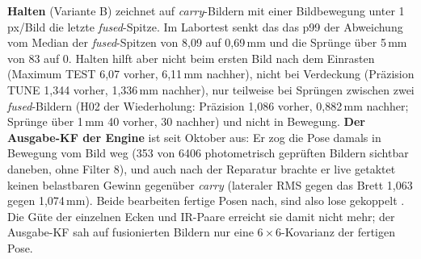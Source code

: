 \documentclass[11pt,a4paper,fleqn]{article}
\begin{document}
\textbf{Halten} (Variante B) zeichnet auf \emph{carry}-Bildern mit einer Bildbewegung unter 1\,px/Bild die letzte
\emph{fused}-Spitze. Im Labortest senkt das das p99 der Abweichung vom Median der \emph{fused}-Spitzen von 8,09
auf 0,69\,mm und die Sprünge über 5\,mm von 83 auf 0. Halten hilft aber nicht beim ersten Bild nach dem
Einrasten (Maximum TEST 6,07 vorher, 6,11\,mm nachher), nicht bei Verdeckung (Präzision TUNE 1,344 vorher,
1,336\,mm nachher), nur teilweise bei Sprüngen zwischen zwei \emph{fused}-Bildern (H02 der Wiederholung: Präzision 1,086
vorher, 0,882\,mm nachher; Sprünge über 1\,mm 40 vorher, 30 nachher) und nicht in Bewegung. \textbf{Der Ausgabe-KF der Engine} ist seit Oktober aus: Er zog die Pose damals in Bewegung vom Bild weg (353 von 6406 photometrisch geprüften
Bildern sichtbar daneben, ohne Filter 8), und auch nach der Reparatur brachte er live getaktet keinen belastbaren
Gewinn gegenüber \emph{carry} (lateraler RMS gegen das Brett 1,063 gegen 1,074\,mm). Beide bearbeiten fertige
Posen nach, sind also lose gekoppelt \cite[S.~493]{tobergte2009robust}. Die Güte der einzelnen Ecken und
IR-Paare erreicht sie damit nicht mehr; der Ausgabe-KF sah auf fusionierten Bildern nur eine
$6\times6$-Kovarianz der fertigen Pose.
\end{document}
